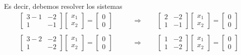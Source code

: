 \documentclass[handout]{beamer} %
\begin{document}
\begin{frame}
    Es decir,  debemos resolver los sistemas
    \begin{align*}
        \begin{bmatrix}
            3 - 1&-2 \\ 1&-1
        \end{bmatrix}
        \begin{bmatrix}
            x_1\\x_2
        \end{bmatrix}
        =
        \begin{bmatrix}
            0\\0
        \end{bmatrix}
        \qquad &\Rightarrow \qquad 
        \begin{bmatrix} 2&-2 \\ 1&-1 \end{bmatrix}
        \begin{bmatrix}
            x_1\\x_2
        \end{bmatrix}
        =
        \begin{bmatrix}
            0\\0
        \end{bmatrix} \tag{S1}
        \\
        &
        \\
        \begin{bmatrix}
            3 - 2&-2 \\ 1&-2
        \end{bmatrix}
        \begin{bmatrix}
            x_1\\x_2
        \end{bmatrix}
        =
        \begin{bmatrix}
            0\\0
        \end{bmatrix}
        \qquad &\Rightarrow \qquad 
        \begin{bmatrix}1&-2 \\ 1&-2\end{bmatrix}
        \begin{bmatrix}
            x_1\\x_2
        \end{bmatrix}
        =
        \begin{bmatrix}
            0\\0
        \end{bmatrix} \tag{S2}

\end{align*}
\end{frame}
\end{document}
